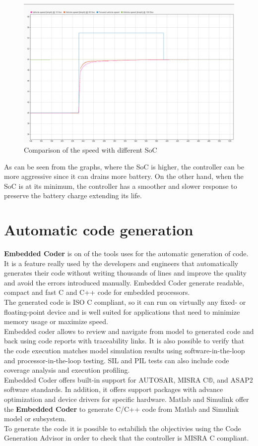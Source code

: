 \documentclass[12pt,a4paper]{report}
\begin{document}
\begin{figure}[htbp]
	\centering
	\includegraphics[scale=0.2]{compareSoC.jpeg}
	\caption{Comparison of the speed with different SoC}
\end{figure}

As can be seen from the graphs, where the SoC is higher, the controller can be more aggressive since it can drains more battery. On the other hand, when the SoC is at its minimum, the controller has a smoother and slower response to preserve the battery charge extending its life.


\section{Automatic code generation}
\textbf{Embedded Coder} is on of the tools uses for the automatic generation of code. It is a feature really used by the developers and engineers that automatically generates their code without writing thousands of lines and improve the quality and avoid the errors introduced manually. 
Embedded Coder generate readable, compact and fast C and C++ code for embedded processors. \\
The generated code is ISO C compliant, so it can run on virtually any fixed- or floating-point device and is well suited for applications that need to minimize memory usage or maximize speed. \\
Embedded coder allows to review and navigate from model to generated code and back using code reports with traceability links. It is also possible to verify that the code execution matches model simulation results using software-in-the-loop and processor-in-the-loop testing. SIL and PIL tests can also include code coverage analysis and execution profiling. \\
Embedded Coder offers built-in support for AUTOSAR, MISRA C®, and ASAP2 software standards. In addition, it offers support packages with advance optimization and device drivers for specific hardware.
Matlab and Simulink offer the \textbf{Embedded Coder} to generate C/C++ code from Matlab and Simulink model or subsystem. \\
To generate the code it is possible to estabilish the objectivies using the Code Generation Advisor in order to check that the controller is MISRA C compliant.\\
\end{document}
